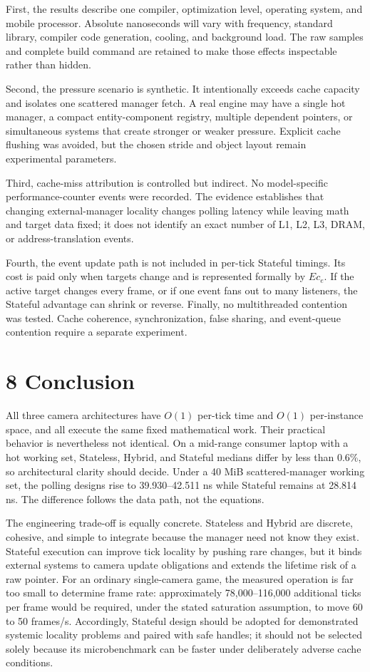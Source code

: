 First, the results describe one compiler, optimization level, operating system, and mobile processor. Absolute nanoseconds will vary with frequency, standard library, compiler code generation, cooling, and background load. The raw samples and complete build command are retained to make those effects inspectable rather than hidden.

Second, the pressure scenario is synthetic. It intentionally exceeds cache capacity and isolates one scattered manager fetch. A real engine may have a single hot manager, a compact entity-component registry, multiple dependent pointers, or simultaneous systems that create stronger or weaker pressure. Explicit cache flushing was avoided, but the chosen stride and object layout remain experimental parameters.

Third, cache-miss attribution is controlled but indirect. No model-specific performance-counter events were recorded. The evidence establishes that changing external-manager locality changes polling latency while leaving math and target data fixed; it does not identify an exact number of L1, L2, L3, DRAM, or address-translation events.

Fourth, the event update path is not included in per-tick Stateful timings. Its cost is paid only when targets change and is represented formally by \(E c_e\). If the active target changes every frame, or if one event fans out to many listeners, the Stateful advantage can shrink or reverse. Finally, no multithreaded contention was tested. Cache coherence, synchronization, false sharing, and event-queue contention require a separate experiment.

\section{8 Conclusion}

All three camera architectures have \(O(1)\) per-tick time and \(O(1)\) per-instance space, and all execute the same fixed mathematical work. Their practical behavior is nevertheless not identical. On a mid-range consumer laptop with a hot working set, Stateless, Hybrid, and Stateful medians differ by less than 0.6\%, so architectural clarity should decide. Under a 40 MiB scattered-manager working set, the polling designs rise to 39.930–42.511 ns while Stateful remains at 28.814 ns. The difference follows the data path, not the equations.

The engineering trade-off is equally concrete. Stateless and Hybrid are discrete, cohesive, and simple to integrate because the manager need not know they exist. Stateful execution can improve tick locality by pushing rare changes, but it binds external systems to camera update obligations and extends the lifetime risk of a raw pointer. For an ordinary single-camera game, the measured operation is far too small to determine frame rate: approximately 78,000–116,000 additional ticks per frame would be required, under the stated saturation assumption, to move 60 to 50 frames/s. Accordingly, Stateful design should be adopted for demonstrated systemic locality problems and paired with safe handles; it should not be selected solely because its microbenchmark can be faster under deliberately adverse cache conditions.

